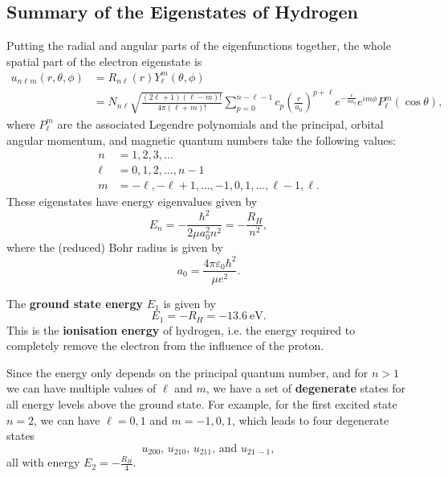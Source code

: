 \documentclass[../quantum_mechanics.tex]{subfiles}
\begin{document}
        \subsection{Summary of the Eigenstates of Hydrogen}\label{sec:energy-eigenstates:subsec:summary-of-eigenstates}
            Putting the radial and angular parts of the eigenfunctions together, the whole spatial part of the electron eigenstate is
            \begin{align}
                u_{n\ell m}(r,\theta,\phi)&=R_{n\ell}(r)Y_\ell^m(\theta,\phi)\\
                &=N_{n\ell}\sqrt{\frac{(2\ell+1)(\ell-m)!}{4\pi(\ell+m)!}}\sum_{p=0}^{n-\ell-1}c_p\left(\frac{r}{a_0}\right)^{p+\ell}e^{-\frac{r}{na_0}}e^{im\phi}P_\ell^m(\cos\theta),
            \end{align}
            where $P_\ell^m$ are the associated Legendre polynomials and the principal, orbital angular momentum, and magnetic quantum numbers take the following values:
            \begin{align}
                n&=1,2,3,\dots\\
                \ell&=0,1,2,\dots,n-1\\
                m&=-\ell,-\ell+1,\dots,-1,0,1,\dots,\ell-1,\ell.
            \end{align} 
            These eigenstates have energy eigenvalues given by
            \begin{equation}
                E_n=-\frac{\hbar^2}{2\mu a_0^2n^2}=-\frac{R_H}{n^2},
            \end{equation}
            where the (reduced) Bohr radius is given by
            \begin{equation}
                a_0=\frac{4\pi\varepsilon_0\hbar^2}{\mu e^2}.
            \end{equation}

            The \textbf{ground state energy} $E_1$ is given by
            \begin{equation}
                E_1=-R_H=-\qty{13.6}{\electronvolt}.
            \end{equation}
            This is the \textbf{ionisation energy} of hydrogen, i.e. the energy required to completely remove the electron from the influence of the proton.

            Since the energy only depends on the principal quantum number, and for $n>1$ we can have multiple values of $\ell$ and $m$, we have a set of \textbf{degenerate} states for all energy levels above the ground state.
            For example, for the first excited state $n=2$, we can have $\ell=0,1$ and $m=-1,0,1$, which leads to four degenerate states
            \begin{equation}
                u_{200},\,u_{210},\,u_{211},\,\text{and }u_{21\,-1},
            \end{equation}
            all with energy $E_2=-\frac{R_H}{4}$.
\end{document}
